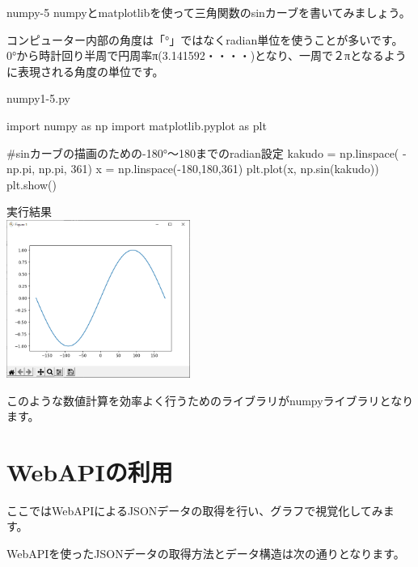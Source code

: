 \begin{pabox}{numpy-5}
numpyとmatplotlibを使って三角関数のsinカーブを書いてみましょう。

コンピューター内部の角度は「°」ではなくradian単位を使うことが多いです。
0°から時計回り半周で円周率π(3.141592・・・・)となり、一周で２πとなるように表現される角度の単位です。

\begin{legbox}{numpy1-5.py}
\begin{listing}{1}
import numpy as np 
import matplotlib.pyplot as plt

#sinカーブの描画のための-180°～180までのradian設定
kakudo = np.linspace( -np.pi, np.pi, 361)
x = np.linspace(-180,180,361)
plt.plot(x, np.sin(kakudo))
plt.show()
\end{listing}

実行結果\\

\includegraphics[width=6cm]{images/graph6.png} 

\end{legbox}


\end{pabox}
このような数値計算を効率よく行うためのライブラリがnumpyライブラリとなります。

\section{WebAPIの利用}
ここではWebAPIによるJSONデータの取得を行い、グラフで視覚化してみます。

WebAPIを使ったJSONデータの取得方法とデータ構造は次の通りとなります。






